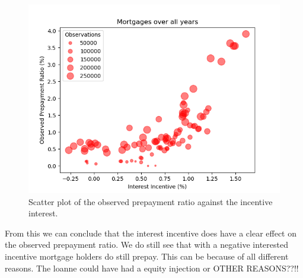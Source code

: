 \begin{figure}[H]
            \centering
            \includegraphics[scale=0.7]{Latex/Report/Figures/Bubbles_all_years.png}
            \caption{Scatter plot of the observed prepayment ratio against the incentive interest.}
            \label{scatter_interest}
        \end{figure}

From this we can conclude that the interest incentive does have a clear effect on the observed prepayment ratio. We do still see that with a negative interested incentive mortgage holders do still prepay. This can be because of all different reasons. The loanne could have had a equity injection or OTHER REASONS??!!